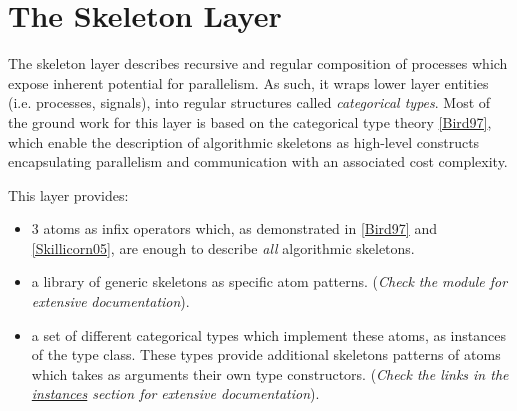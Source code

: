 \section{The Skeleton Layer}
The skeleton layer describes recursive and regular composition
 of processes which expose inherent potential for parallelism. As
 such, it wraps lower layer entities (i.e. processes, signals),
 into regular structures called \emph{categorical types}. Most of the
 ground work for this layer is based on the categorical type
 theory \href{#bird97}{[Bird97]}, which enable the description of
 algorithmic skeletons as high-level constructs encapsulating
 parallelism and communication with an associated cost complexity.\par
This layer provides:\par
\begin{itemize}
\item
3 atoms as infix operators which, as demonstrated in \href{#bird97}{[Bird97]}
 and \href{#skillicorn05}{[Skillicorn05]}, are enough to describe \emph{all}
 algorithmic skeletons.\par

\item
a library of generic skeletons as specific atom patterns.
 (\emph{Check the  module for extensive}
 \emph{documentation}).\par

\item
a set of different categorical types which implement these
 atoms, as instances of the  type class. These types
 provide additional skeletons patterns of atoms which takes as
 arguments their own type constructors.
 (\emph{Check the links in the \href{#section.i:Skeleton}{instances} section for}
 \emph{extensive documentation}).\par

\end{itemize}

